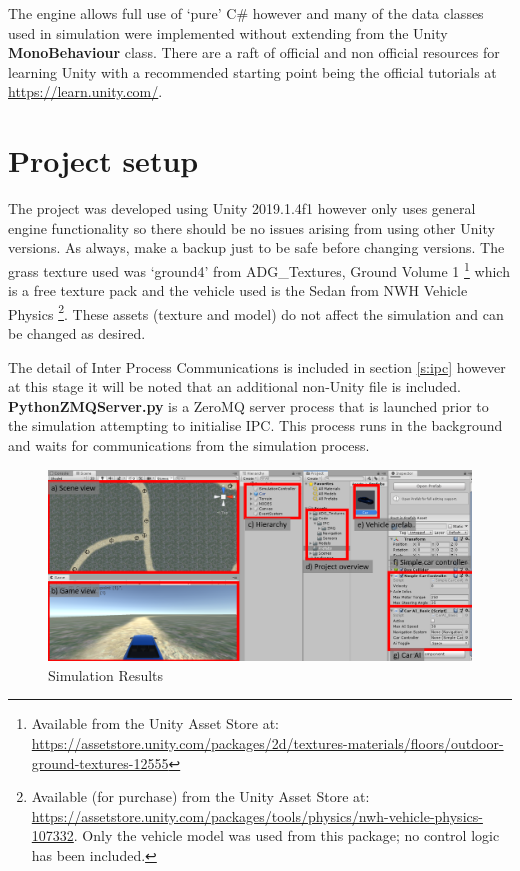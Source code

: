 \documentclass{article}
\begin{document}
The engine allows full use of `pure' C\# however and many of the data classes used in simulation were implemented without extending from the Unity \textbf{MonoBehaviour} class. There are a raft of official and non official resources for learning Unity with a recommended starting point being the official tutorials at \url{https://learn.unity.com/}. 

\section{Project setup}

The project was developed using Unity 2019.1.4f1 however only uses general engine functionality so there should be no issues arising from using other Unity versions. As always, make a backup just to be safe before changing versions. The grass texture used was `ground4' from ADG\_Textures, Ground Volume 1 \footnote{Available from the Unity Asset Store at:  \url{https://assetstore.unity.com/packages/2d/textures-materials/floors/outdoor-ground-textures-12555} } which is a free texture pack and the vehicle used is the Sedan from NWH Vehicle Physics \footnote{Available (for purchase) from the Unity Asset Store at: \url{https://assetstore.unity.com/packages/tools/physics/nwh-vehicle-physics-107332}. Only the vehicle model was used from this package; no control logic has been included. }. These assets (texture and model) do not affect the simulation and can be changed as desired.

The detail of Inter Process Communications is included in section \ref{s:ipc} however at this stage it will be noted that an additional non-Unity file is included. \textbf{PythonZMQServer.py} is a ZeroMQ server process that is launched prior to the simulation attempting to initialise IPC. This process runs in the background and waits for communications from the simulation process.

\begin{figure}[h!]
	\centering
	\includegraphics[width=0.95\linewidth]{projectOverviewAnnotated.png}
	\caption{Simulation Results}
	\label{projectOverviewAnnotated}
\end{figure}
\end{document}
